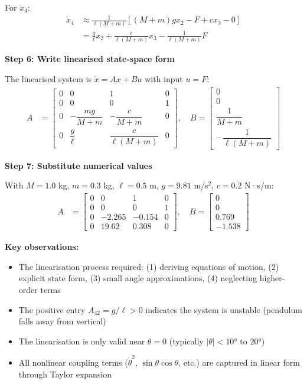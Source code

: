 \documentclass[11pt,a4paper]{article}
\begin{document}
For $\dot{x}_4$:
\begin{align}
\dot{x}_4 &\approx \frac{1}{\ell(M+m)}\left[(M+m)gx_2 - F + cx_3 - 0\right]\\
&= \frac{g}{\ell}x_2 + \frac{c}{\ell(M+m)}x_3 - \frac{1}{\ell(M+m)}F
\end{align}

\textbf{Step 6: Write linearised state-space form}

The linearised system is $\dot{x} = Ax + Bu$ with input $u = F$:
\begin{align}
A &= \begin{bmatrix}
0 & 0 & 1 & 0\\
0 & 0 & 0 & 1\\
0 & -\dfrac{mg}{M+m} & -\dfrac{c}{M+m} & 0\\[0.5em]
0 & \dfrac{g}{\ell} & \dfrac{c}{\ell(M+m)} & 0
\end{bmatrix}, \quad
B = \begin{bmatrix}
0\\[0.2em]
0\\[0.2em]
\dfrac{1}{M+m}\\[0.5em]
-\dfrac{1}{\ell(M+m)}
\end{bmatrix}
\end{align}

\textbf{Step 7: Substitute numerical values}

With $M = 1.0$ kg, $m = 0.3$ kg, $\ell = 0.5$ m, $g = 9.81$ m/s$^2$, $c = 0.2$ N·s/m:
\begin{align}
A &= \begin{bmatrix}
0 & 0 & 1 & 0\\
0 & 0 & 0 & 1\\
0 & -2.265 & -0.154 & 0\\
0 & 19.62 & 0.308 & 0
\end{bmatrix}, \quad
B = \begin{bmatrix}
0\\
0\\
0.769\\
-1.538
\end{bmatrix}
\end{align}

\textbf{Key observations:}
\begin{itemize}
\item The linearisation process required: (1) deriving equations of motion, (2) explicit state form, (3) small angle approximations, (4) neglecting higher-order terms
\item The positive entry $A_{42} = g/\ell > 0$ indicates the system is unstable (pendulum falls away from vertical)
\item The linearisation is only valid near $\theta = 0$ (typically $|\theta| < 10°$ to $20°$)
\item All nonlinear coupling terms ($\dot{\theta}^2$, $\sin\theta\cos\theta$, etc.) are captured in linear form through Taylor expansion
\end{itemize}
\end{document}
